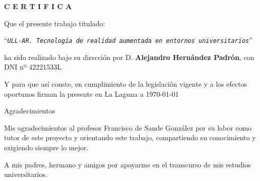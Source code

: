\documentclass[spanish,a4paper,12pt,oneside]{extreport}
\newcommand{\BulletP}{\texttt{ULL-AR.{ Tecnología de realidad aumentada en entornos universitarios}}}
\begin{document}
\bigskip

\bigskip
\bigskip
{\bf C E R T I F I C A}

\bigskip
\bigskip
\bigskip
Que el presente trabajo titulado:

\bigskip
``{\it \BulletP{}}''

\bigskip
\bigskip
\bigskip
\noindent ha sido realizado bajo su dirección por D. {\bf Alejandro Hernández Padrón}, con DNI nº 42221533L

\bigskip
\bigskip

Y para que así conste, en cumplimiento de la legislación vigente y a los efectos
oportunos firman la presente en La Laguna a \today

\newpage
\thispagestyle{empty}

{ \flushright

\begin{LARGE}
Agradecimientos
\end{LARGE}

\hspace{3mm}

\begin{large}


\hspace{3mm}
Mis agradecimientos al profesor Francisco de Sande González por
su labor como tutor de este proyecto y orientando este trabajo,
compartiendo su conocimiento y exigiendo siempre lo mejor.


\hspace{3mm}
A mis padres, hermano y amigos por apoyarme en el transcurso de mis 
estudios universitarios. 
\end{large}

}




\end{document}
